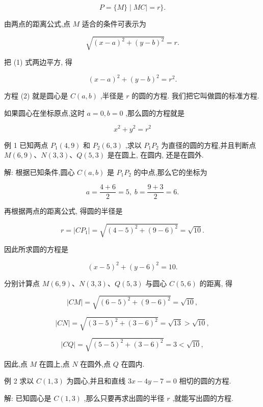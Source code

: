 \documentclass[lang=cn,newtx,10pt,scheme=chinese]{elegantbook}
\begin{document}
\[
  P = \{ M\} \mid {MC} \mid = r\} .
\]

由两点的距离公式,点 \(M\) 适合的条件可表示为

\[
  \sqrt{{\left( x - a\right) }^{2} + {\left( y - b\right) }^{2}} = r. \tag{1}
\]

把 (1) 式两边平方, 得

\[
    {\left( x - a\right) }^{2} + {\left( y - b\right) }^{2} = {r}^{2}. \tag{2}
\]

方程 (2) 就是圆心是 \(C\left( {a,b}\right)\) ,半径是 \(r\) 的圆的方程. 我们把它叫做圆的标准方程.

如果圆心在坐标原点,这时 \(a = 0,b = 0\) ,那么圆的方程就是

\[
    {x}^{2} + {y}^{2} = {r}^{2}
\]

例 1 已知两点 \({P}_{1}\left( {4,9}\right)\) 和 \({P}_{2}\left( {6,3}\right)\) ,求以 \({P}_{1}{P}_{2}\) 为直径的圆的方程,并且判断点 \(M\left( {6,9}\right) \text{、}N\left( {3,3}\right) \text{、}Q\left( {5,3}\right)\) 是在圆上, 在圆内, 还是在圆外.

解: 根据已知条件,圆心 \(C\left( {a,b}\right)\) 是 \({P}_{1}{P}_{2}\) 的中点,那么它的坐标为

\[
  a = \frac{4 + 6}{2} = 5,\;b = \frac{9 + 3}{2} = 6.
\]

再根据两点的距离公式, 得圆的半径是

\[
  r = \left| {C{P}_{1}}\right| = \sqrt{{\left( 4 - 5\right) }^{2} + {\left( 9 - 6\right) }^{2}} = \sqrt{10}.
\]

因此所求圆的方程是

\[
    {\left( x - 5\right) }^{2} + {\left( y - 6\right) }^{2} = {10}.
\]

分别计算点 \(M\left( {6,9}\right) \text{、}N\left( {3,3}\right) \text{、}Q\left( {5,3}\right)\) 与圆心 \(C\left( {5,6}\right)\) 的距离, 得

\[
  \left| {CM}\right| = \sqrt{{\left( 6 - 5\right) }^{2} + {\left( 9 - 6\right) }^{2}} = \sqrt{10},
\]

\[
  \left| {CN}\right| = \sqrt{{\left( 3 - 5\right) }^{2} + {\left( 3 - 6\right) }^{2}} = \sqrt{13} > \sqrt{10},
\]

\[
  \left| {CQ}\right| = \sqrt{{\left( 5 - 5\right) }^{2} + {\left( 3 - 6\right) }^{2}} = 3 < \sqrt{10},
\]

因此,点 \(M\) 在圆上,点 \(N\) 在圆外,点 \(Q\) 在圆内.

例 2 求以 \(C\left( {1,3}\right)\) 为圆心,并且和直线 \({3x} - {4y} - 7 = 0\) 相切的圆的方程.

解: 已知圆心是 \(C\left( {1,3}\right)\) ,那么只要再求出圆的半径 \(r\) ,就能写出圆的方程.
\end{document}
